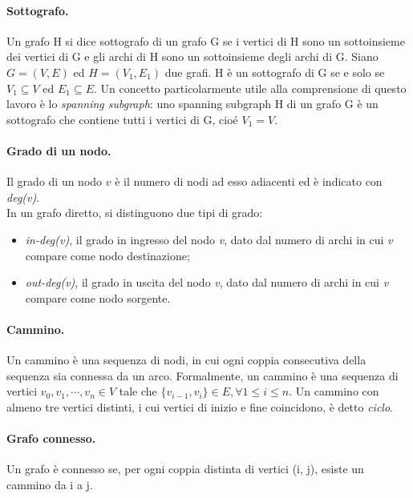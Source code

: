 \paragraph{Sottografo.} Un grafo H si dice sottografo di un grafo G se i vertici di H sono un sottoinsieme dei vertici di G e gli archi di H sono un sottoinsieme degli archi di G. Siano $G=(V, E)$ ed $H=(V_1, E_1)$ due grafi. H è un sottografo di G se e solo se $V_1 \subseteq V$ ed $E_1 \subseteq E$.
Un concetto particolarmente utile alla comprensione di questo lavoro è lo \textit{spanning subgraph}: uno spanning subgraph H di un grafo G è un sottografo che contiene tutti i vertici di G, cioé $V_1 = V$.
\paragraph{Grado di un nodo.} Il grado di un nodo $v$ è il numero di nodi ad esso adiacenti ed è indicato con \textit{deg(v)}.\\
In un grafo diretto, si distinguono due tipi di grado:
\begin{itemize}
	\item \textit{in-deg(v)}, il grado in ingresso del nodo \textit{v}, dato dal numero di archi in cui \textit{v} compare come nodo destinazione;
	\item \textit{out-deg(v)}, il grado in uscita del nodo \textit{v}, dato dal numero di archi in cui \textit{v} compare come nodo sorgente.
\end{itemize}
\paragraph{Cammino.} Un cammino è una sequenza di nodi, in cui ogni coppia consecutiva della sequenza sia connessa da un arco. Formalmente, un cammino è una sequenza di vertici $v_0, v_1, \cdots, v_n \in V$ tale che $\lbrace v_{i-1}, v_i\rbrace \in E, \forall 1\leq i \leq n$. Un cammino con almeno tre vertici distinti, i cui vertici di inizio e fine coincidono, è detto \textit{ciclo}.
\paragraph{Grafo connesso.} Un grafo è connesso se, per ogni coppia distinta di vertici (i, j), esiste un cammino da i a j.

